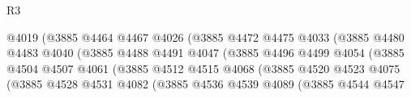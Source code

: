 \begin{lexlean}{R3}
\begin{coremodule}
                                          @4019
                                          (@3885
                                            @4464
                                            @4467
                                            @4026
                                            (@3885
                                              @4472
                                              @4475
                                              @4033
                                              (@3885
                                                @4480
                                                @4483
                                                @4040
                                                (@3885
                                                  @4488
                                                  @4491
                                                  @4047
                                                  (@3885
                                                    @4496
                                                    @4499
                                                    @4054
                                                    (@3885
                                                      @4504
                                                      @4507
                                                      @4061
                                                      (@3885
                                                        @4512
                                                        @4515
                                                        @4068
                                                        (@3885
                                                          @4520
                                                          @4523
                                                          @4075
                                                          (@3885
                                                            @4528
                                                            @4531
                                                            @4082
                                                            (@3885
                                                              @4536
                                                              @4539
                                                              @4089
                                                              (@3885
                                                                @4544
                                                                @4547

\end{coremodule}
\end{lexlean}
